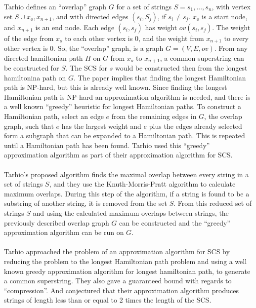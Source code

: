 \documentclass[letterpaper,11pt,titlepage]{article}
\begin{document}
Tarhio defines an ``overlap'' graph $G$ for a set of strings $S = {s_1, ... ,s_n}$, with vertex set $S \cup {x_o, x_{n+1}}$, and with directed edges $(s_i, S_j)$, if $s_i \neq s_j$.  $x_o$ is a start node, and $x_{n+1}$ is an end node.  Each edge $(s_i, s_j)$ has weight $ov(s_i, s_j)$.  The weight of the edge from $x_o$ to each other vertex is $0$, and the weight from $x_{n+1}$ to every other vertex is $0$.  So, the ``overlap'' graph, is a graph $G = (V, E, ov)$.  From any directed hamiltonian path $H$ on $G$ from $x_o$ to $x_{n+1}$, a common superstring can be constructed for $S$.  The SCS for $s$ would be constructed then from the longest hamiltonina path on $G$.  
The paper implies that finding the longest Hamiltonian path is NP-hard, but this is already well known.  Since finding the longest Hamiltonian path is NP-hard an approximation algorithm is needed, and there is a well known ``greedy'' heuristic for longest Hamiltonian paths.  To construct a Hamiltonian path, select an edge $e$ from the remaining edges in $G$, the overlap graph, such that $e$ has the largest weight and $e$ plus the edges already selected form a subgraph that can be expanded to a Hamiltonian path.  This is repeated until a Hamiltonian path has been found.  Tarhio used this ``greedy'' approximation algorithm as part of their approximation algorithm for SCS.  \\ \\

Tarhio's proposed algorithm finds the maximal overlap between every string in a set of strings $S$, and they use the Knuth-Morris-Pratt algorithm to calculate maximum overlaps.  During this step of the algorithm, if a string is found to be a substring of another string, it is removed from the set $S$.  From this reduced set of strings $S$ and using the calculated maximum overlaps between strings, the previously described overlap graph $G$ can be constructed and the ``greedy'' approximation algorithm can be run on $G$.  \\ \\

Tarhio approached the problem of an approximation algorithm for SCS by reducing the problem to the longest Hamiltonian path problem and using a well known greedy approximation algorithm for longest hamiltonian path, to generate a common superstring.  They also gave a guaranteed bound with regards to ``compression''.  And conjectured  that their approximation algorithm produces strings of length less than or equal to $2$ times the length of the SCS.   \\ \\
\end{document}

